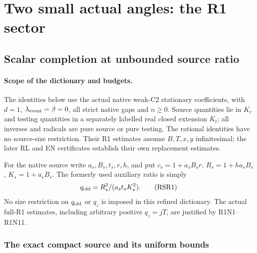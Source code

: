 \section{Two small actual angles: the R1 sector}
\subsection{Scalar completion at unbounded source ratio}
\label{component:p9e725a065583}

\label{p9e725a065583:sec:reconstructed-r1-qo-source-scalar}

\paragraph{Scope of the dictionary and budgets.}
The identities below use the actual native weak-C2 stationary coefficients,
with $d=1$, $\lambda_{\rm event}=\beta=0$, all strict native gaps and
$n\ge0$. Source quantities lie in $K_c$ and testing quantities in a
separately labelled real closed extension $K_t$; all inverses and radicals
are pure source or pure testing. The rational identities have no source-size
restriction. Their R1 estimates assume $B,T,x,y$ infinitesimal; the later
RL and EN certificates establish their own replacement estimates.

For the native source write $a_s,B_s,t_s,r,h$, and put
$c_s=1+a_sB_sr$, $R_s=1+ha_sB_s$, $K_s=1+a_sB_s$.
The formerly used auxiliary ratio is simply
\[
 q_{\rm old}=R_s^2/(a_st_sK_s^2).\tag{RSR1}
\]
No size restriction on $q_{\rm old}$ or $q_z$ is imposed in this
refined dictionary. The actual full-R1 estimates, including arbitrary
positive $q_z=jT$, are justified by R1N1--R1N11.

\subsubsection*{The exact compact source and its uniform bounds}

